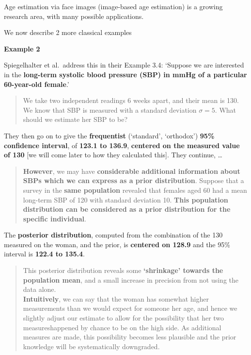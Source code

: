 \documentclass[]{book}
\begin{document}
Age estimation via face images (image-based age estimation) is a growing research area, with many possible applications.

We now describe 2 more classical examples

\textbf{Example 2}

Spiegelhalter et al.~address this in their Example 3.4: `Suppose we are interested in the \textbf{long-term systolic blood pressure (SBP)
in mmHg of a particular 60-year-old female}.'

\begin{quote}
We take two independent readings 6 weeks apart, and their mean is 130. We know that SBP is measured with a standard deviation \(\sigma = 5.\) What should we estimate her SBP to be?
\end{quote}

They then go on to give the \textbf{frequentist} (`standard', `orthodox') \textbf{95\% confidence interval},
of \textbf{123.1 to 136.9}, \textbf{centered on the measured value of 130} {[}we will come later to how they calculated this{]}. They continue, \ldots{}

\begin{quote}
\textbf{However}, we may have \textbf{considerable additional information about SBPs
which we can express as a prior distribution}. Suppose that a survey in the
\textbf{same population} revealed that females aged 60 had a mean long-term
SBP of 120 with standard deviation 10. \textbf{This population distribution can be
considered as a prior distribution for the specific individual}.
\end{quote}

The \textbf{posterior distribution}, computed from the combination of the 130 measured on the woman,
and the prior, is \textbf{centered on 128.9} and
the 95\% interval is \textbf{122.4 to 135.4}.

\begin{quote}
This posterior distribution reveals some \textbf{`shrinkage' towards the population mean}, and a small increase in precision from not using the data alone.\\
\textbf{Intuitively}, we can say that the woman has somewhat higher measurements than we would expect for someone her age, and hence we slightly adjust our estimate to allow for the possibility that her two measureshappened by chance to be on the high side. As additional measures are made, this possibility becomes less plausible and the prior knowledge will be systematically downgraded.
\end{quote}
\end{document}
